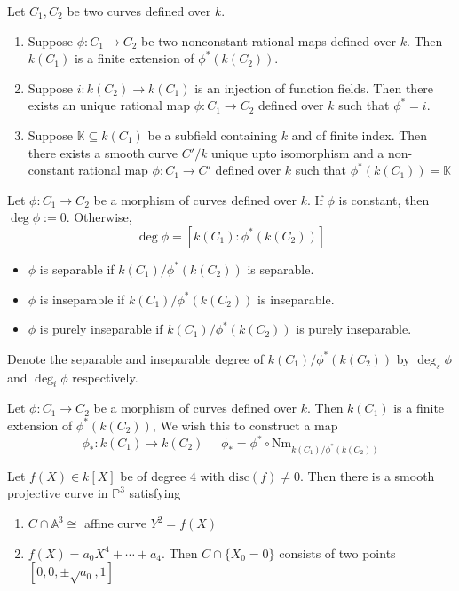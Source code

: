 \documentclass[oneside, 12pt]{scrbook}
\newcommand{\Aa}{\mathbb{A}}
\newcommand{\PP}{\mathbb{P}}
\theoremstyle{theorem}
\begin{document}
\begin{theorem}
Let $C_{1},C_{2}$ be two curves defined over $k$. 
\begin{enumerate}
\item Suppose $\phi: C_{1} \rightarrow C_{2}$ be two nonconstant rational maps defined over $k$. Then $k(C_{1})$ is a finite extension of $\phi^{*}(k(C_{2}))$. 
\item Suppose $i : k(C_{2}) \rightarrow k(C_{1})$ is an injection of function fields. Then there exists an unique rational map $\phi : C_{1} \rightarrow C_{2}$ defined over $k$ such that $\phi^{*} = i$.
\item Suppose $\mathbb{K} \subseteq k(C_{1})$ be a subfield containing $k$ and of finite index. Then there exists a smooth curve $C'/k$ unique upto isomorphism and a non-constant rational map $\phi: C_{1} \rightarrow C'$ defined over $k$ such that $\phi^* (k(C_{1})) = \mathbb{K}$
\end{enumerate}
\end{theorem}
\begin{definition}
Let $\phi: C_{1} \rightarrow C_{2}$ be a morphism of curves defined over $k$. If $\phi$ is constant, then $\deg \phi :=0$. Otherwise, $$\deg \phi = [k(C_{1}): \phi^* (k(C_{2}))]$$ 
\begin{itemize}
\item $\phi$ is separable if $k(C_{1})/\phi^* (k(C_{2}))$ is separable.
\item $\phi$ is inseparable if $k(C_{1})/\phi^* (k(C_{2}))$ is inseparable.
\item $\phi$ is purely inseparable if $k(C_{1})/\phi^* (k(C_{2}))$ is purely inseparable.
\end{itemize}
Denote the separable and inseparable degree of $k(C_{1})/\phi^*(k(C_{2}))$ by $\deg_{s}\phi $ and $\deg_{i} \phi$ respectively.
\end{definition}

\begin{definition}
Let $\phi: C_{1} \rightarrow C_{2}$ be a morphism of curves defined over $k$. Then $k(C_{1})$ is a finite extension of $\phi^* (k(C_{2}))$, We wish this to construct a map \begin{equation}
\phi_{*} : k(C_{1}) \rightarrow k(C_{2}) \;\;\;\;\; \phi_{*} = \phi^* \circ \mathrm{Nm}_{k(C_{1})/\phi^*(k(C_{2}))}
\end{equation}
\end{definition}

\begin{proposition}
Let $f(X) \in k[X]$ be of degree $4$ with $\mathrm{disc}(f) \neq 0$. Then there is a smooth projective curve in $\PP^3$ satisfying 
\begin{enumerate}
\item $C \cap \Aa^3 \cong$ affine curve $Y^2 = f(X)$
\item $f(X)=a_{0}X^4 + \cdots + a_{4}$. Then $C \cap \{X_{0}=0\}$ consists of two points $[0,0, \pm \sqrt{a_{0}}, 1]$
\end{enumerate}
\end{proposition}
\end{document}
